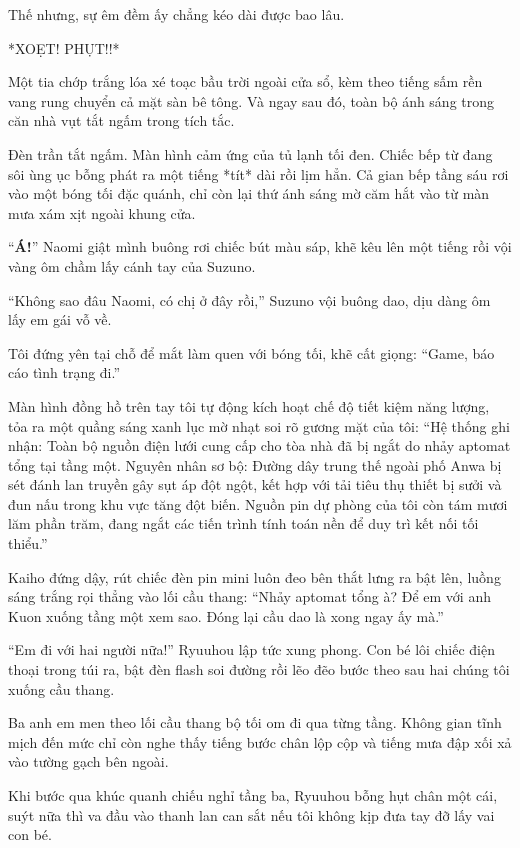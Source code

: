 \documentclass[../main.tex]{subfiles}
\begin{document}
Thế nhưng, sự êm đềm ấy chẳng kéo dài được bao lâu.

*XOẸT! PHỤT!!*

Một tia chớp trắng lóa xé toạc bầu trời ngoài cửa sổ, kèm theo tiếng sấm rền vang rung chuyển cả mặt sàn bê tông. Và ngay sau đó, toàn bộ ánh sáng trong căn nhà vụt tắt ngấm trong tích tắc.

Đèn trần tắt ngấm. Màn hình cảm ứng của tủ lạnh tối đen. Chiếc bếp từ đang sôi ùng ục bỗng phát ra một tiếng *tít* dài rồi lịm hẳn. Cả gian bếp tầng sáu rơi vào một bóng tối đặc quánh, chỉ còn lại thứ ánh sáng mờ căm hắt vào từ màn mưa xám xịt ngoài khung cửa.

``\textbf{Á!}'' Naomi giật mình buông rơi chiếc bút màu sáp, khẽ kêu lên một tiếng rồi vội vàng ôm chầm lấy cánh tay của Suzuno.

``Không sao đâu Naomi, có chị ở đây rồi,'' Suzuno vội buông dao, dịu dàng ôm lấy em gái vỗ về.

Tôi đứng yên tại chỗ để mắt làm quen với bóng tối, khẽ cất giọng: ``Game, báo cáo tình trạng đi.''

Màn hình đồng hồ trên tay tôi tự động kích hoạt chế độ tiết kiệm năng lượng, tỏa ra một quầng sáng xanh lục mờ nhạt soi rõ gương mặt của tôi: ``Hệ thống ghi nhận: Toàn bộ nguồn điện lưới cung cấp cho tòa nhà đã bị ngắt do nhảy aptomat tổng tại tầng một. Nguyên nhân sơ bộ: Đường dây trung thế ngoài phố Anwa bị sét đánh lan truyền gây sụt áp đột ngột, kết hợp với tải tiêu thụ thiết bị sưởi và đun nấu trong khu vực tăng đột biến. Nguồn pin dự phòng của tôi còn tám mươi lăm phần trăm, đang ngắt các tiến trình tính toán nền để duy trì kết nối tối thiểu.''

Kaiho đứng dậy, rút chiếc đèn pin mini luôn đeo bên thắt lưng ra bật lên, luồng sáng trắng rọi thẳng vào lối cầu thang: ``Nhảy aptomat tổng à? Để em với anh Kuon xuống tầng một xem sao. Đóng lại cầu dao là xong ngay ấy mà.''

``Em đi với hai người nữa!'' Ryuuhou lập tức xung phong. Con bé lôi chiếc điện thoại trong túi ra, bật đèn flash soi đường rồi lẽo đẽo bước theo sau hai chúng tôi xuống cầu thang.

\ct

Ba anh em men theo lối cầu thang bộ tối om đi qua từng tầng. Không gian tĩnh mịch đến mức chỉ còn nghe thấy tiếng bước chân lộp cộp và tiếng mưa đập xối xả vào tường gạch bên ngoài.

Khi bước qua khúc quanh chiếu nghỉ tầng ba, Ryuuhou bỗng hụt chân một cái, suýt nữa thì va đầu vào thanh lan can sắt nếu tôi không kịp đưa tay đỡ lấy vai con bé.
\end{document}
